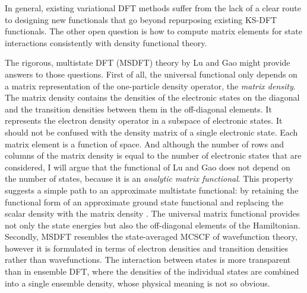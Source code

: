 \documentclass[journal=jpclcd,manuscript=letter]{achemso}
\begin{document}
In general, existing variational DFT methods suffer from the lack of a clear route to designing new
functionals that go beyond repurposing existing KS-DFT functionals. The other open question is how
to compute matrix elements for state interactions consistently with density functional theory.

The rigorous, multistate DFT (MSDFT) theory by Lu and Gao \cite{Lu2022JPCL} might provide answers to those questions.
First of all, the universal functional only depends on a matrix representation of the one-particle density
operator, the \emph{matrix density}. The matrix density contains the densities of the electronic states on the diagonal
and the transition densities between them in the off-diagonal elements. It represents the electron density operator
in a subspace of electronic states. It should not be confused with the density matrix of a single electronic state.
Each matrix element is a function of space. And although the number of rows and columns of the matrix density is equal
to the number of electronic states that are considered, I will
argue that the functional of Lu and Gao does not depend on the number of states,
because it is an \emph{analytic matrix functional}.
This property suggests a simple path to an approximate multistate functional: by retaining the functional form
of an approximate ground state functional and replacing the scalar density with the matrix density \cite{lu_gao_2021_chemrxiv}.
The universal matrix functional provides not only the state energies but also the off-diagonal elements of the Hamiltonian.
Secondly, MSDFT resembles the state-averaged MCSCF of wavefunction theory,
however it is formulated in terms of electron densities and transition densities rather than wavefunctions.
The interaction between states is more transparent than in ensemble DFT,
where the densities of the individual states are combined into a single ensemble density,
whose physical meaning is not so obvious.
\end{document}
